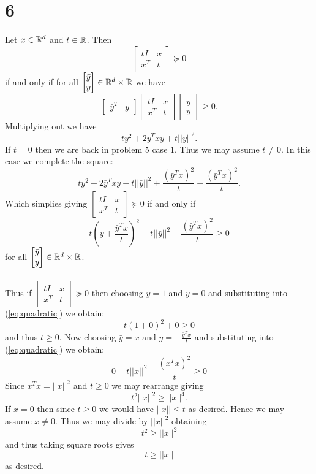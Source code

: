 \documentclass[letterpaper,12pt,oneside,onecolumn]{article}
\begin{document}
\section*{6}
\paragraph{}
Let $x\in \mathbb{R}^d$ and $t\in \mathbb{R}$. Then
$$\begin{bmatrix}tI & x \\ x^T & t \end{bmatrix} \succcurlyeq 0$$ if and only if for all $\begin{bmatrix} \bar{y} \\y \end{bmatrix} \in \mathbb{R}^d \times \mathbb{R}$ we have
$$\begin{bmatrix}\bar{y}^T & y \end{bmatrix} \begin{bmatrix}tI & x \\ x^T & t \end{bmatrix} \begin{bmatrix} \bar{y} \\y \end{bmatrix} \geq 0.$$
Multiplying out we have
$$ty^2 + 2\bar{y}^Txy + t||\bar{y}||^2.$$
If $t = 0$ then we are back in problem $5$ case $1$. Thus we may assume $t\neq 0$. In this case we complete the square:
$$ty^2 + 2\bar{y}^Txy + t||\bar{y}||^2 + \frac{(\bar{y}^Tx)^2}{t}-\frac{(\bar{y}^Tx)^2}{t}.$$
Which simplies giving $\begin{bmatrix}tI & x \\ x^T & t \end{bmatrix} \succcurlyeq 0$ if and only if
\begin{equation}t(y+\frac{\bar{y}^Tx}{t})^2 + t||\bar{y}||^2 - \frac{(\bar{y}^Tx)^2}{t} \geq 0\label{eq:quadratic}\end{equation}
for all $\begin{bmatrix} \bar{y} \\y \end{bmatrix} \in \mathbb{R}^d \times \mathbb{R}$.
\paragraph{}
Thus if $\begin{bmatrix}tI & x \\ x^T & t \end{bmatrix} \succcurlyeq 0$ then choosing $y =1$ and $\bar{y} = 0$ and substituting into (\ref{eq:quadratic}) we obtain:
$$t(1 + 0)^2 + 0 \geq 0$$
and thus $t \geq 0$. Now choosing $\bar{y} = x$ and $y = -\frac{\bar{y}^Tx}{t}$ and substituting into (\ref{eq:quadratic}) we obtain:
$$0 + t||x||^2 - \frac{(x^Tx)^2}{t} \geq 0$$
Since $x^Tx = ||x||^2$ and $t\geq 0$ we may rearrange giving
$$t^2||x||^2 \geq ||x||^4.$$
If $x = 0$ then since $t \geq 0$ we would have $||x|| \leq t$ as desired. Hence we may assume $x \neq 0$. Thus we may divide by $||x||^2$ obtaining
$$t^2 \geq ||x||^2$$
and thus taking square roots gives
$$t \geq ||x||$$ as desired.
\end{document}
